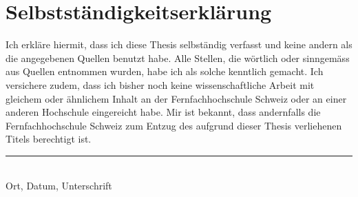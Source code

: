 \chapter*{Selbstständigkeitserklärung}
Ich erkläre hiermit, dass ich diese Thesis selbständig verfasst 
und keine andern als die angegebenen Quellen benutzt habe. 
Alle Stellen, die wörtlich oder sinngemäss aus Quellen entnommen wurden, 
habe ich als solche kenntlich gemacht. Ich versichere zudem, dass ich bisher 
noch keine wissenschaftliche Arbeit mit gleichem oder ähnlichem Inhalt an der 
Fernfachhochschule Schweiz oder an einer anderen Hochschule eingereicht habe. 
Mir ist bekannt, dass andernfalls die Fernfachhochschule Schweiz zum Entzug 
des aufgrund dieser Thesis verliehenen Titels berechtigt ist.

\vspace{4cm}
\noindent
\hrule \ \\[-0.5ex]
Ort, Datum, Unterschrift
